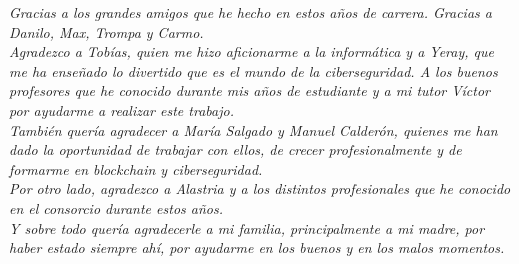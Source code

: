 \textit{Gracias a los grandes amigos que he hecho en estos años de carrera. Gracias a Danilo, Max, Trompa y Carmo.}\\

\textit{Agradezco a Tobías, quien me hizo aficionarme a la informática y a Yeray, que me ha enseñado lo divertido que es el mundo de la ciberseguridad. A los buenos profesores que he conocido durante mis años de estudiante y a mi tutor Víctor por ayudarme a realizar este trabajo.}\\

\textit{También quería agradecer a María Salgado y Manuel Calderón, quienes me han dado la oportunidad de trabajar con ellos, de crecer profesionalmente y de formarme en blockchain y ciberseguridad.}\\

\textit{Por otro lado, agradezco a Alastria y a los distintos profesionales que he conocido en el consorcio durante estos años.}\\

\textit{Y sobre todo quería agradecerle a mi familia, principalmente a mi madre, por haber estado siempre ahí, por ayudarme en los buenos y en los malos momentos.}\\




